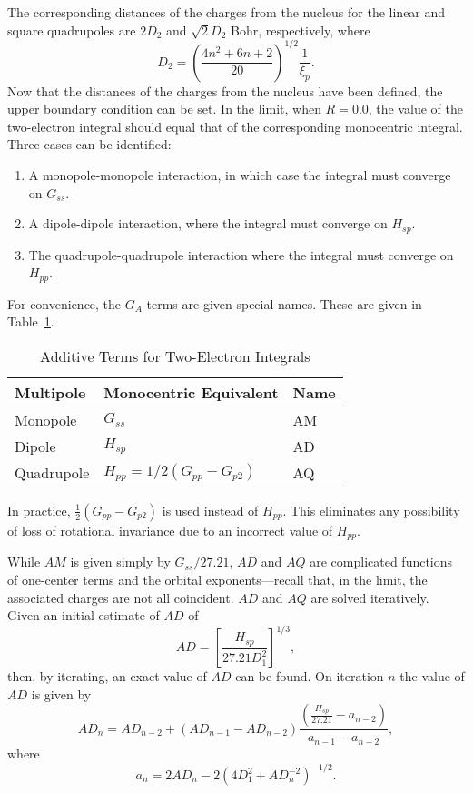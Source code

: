 The corresponding distances of the charges from the
nucleus for the linear and square quadrupoles are $2D_2$ and
$\sqrt{2}D_2$ Bohr, respectively, where
$$
D_2=\left(\frac{4n^2+6n+2}{20}\right)^{1/2}\frac{1}{\xi_p}.
$$
 Now that the distances of the charges from the nucleus
have been defined, the upper boundary condition can be set.
In the limit, when $R=0.0$, the value of the two-electron
integral should equal that of the corresponding monocentric
integral. Three cases can be identified:
\begin{enumerate}
\item  A monopole-monopole interaction, in which case the
integral must converge on $G_{ss}$.
\item A dipole-dipole interaction, where the integral must
converge on $H_{sp}$.
\item The quadrupole-quadrupole interaction where the
integral must converge on $H_{pp}$.
\end{enumerate}
 For convenience, the $G_A$ terms are given special names.
These are given in Table~\ref{aa}.
\begin{table}
\caption{\label{aa} Additive Terms for Two-Electron Integrals}
\begin{center}
\begin{tabular}{lll} \hline
 Multipole & Monocentric Equivalent & Name  \\ \hline
 Monopole  & $G_{ss}$ &  AM  \\
 Dipole &  $H_{sp}$ &  AD  \\
 Quadrupole &  $H_{pp} =1/2(G_{pp}-G_{p2})$ & AQ \\ \hline
\end{tabular}
\end{center}
\end{table}
 In practice, $\frac{1}{2}(G_{pp}-G_{p2})$ is used instead of $H_{pp}$.
This eliminates any
possibility of loss of rotational invariance due to an incorrect value
of  $H_{pp}$.

 While $AM$ is given simply by $G_{ss}/27.21$, $AD$ and $AQ$ are
complicated functions of one-center terms and the orbital
exponents---recall that, in the limit, the associated
charges are not all coincident. $AD$ and $AQ$ are solved
iteratively. Given an initial estimate of $AD$ of
$$
AD = \left[\frac{H_{sp}}{27.21D^2_1}\right]^{1/3},
$$
then, by iterating, an exact value of $AD$ can be found. On
iteration $n$ the value of $AD$ is given by
$$
AD_n = AD_{n-2}+(AD_{n-1}-AD_{n-2})\frac{(\frac{H_{sp}}{27.21}-a_{n-2})}{a_{n-1}-a_{n-2}},
$$
where
$$
a_n=2AD_n-2(4D^2_1+AD^{-2}_n)^{-1/2}.
$$

